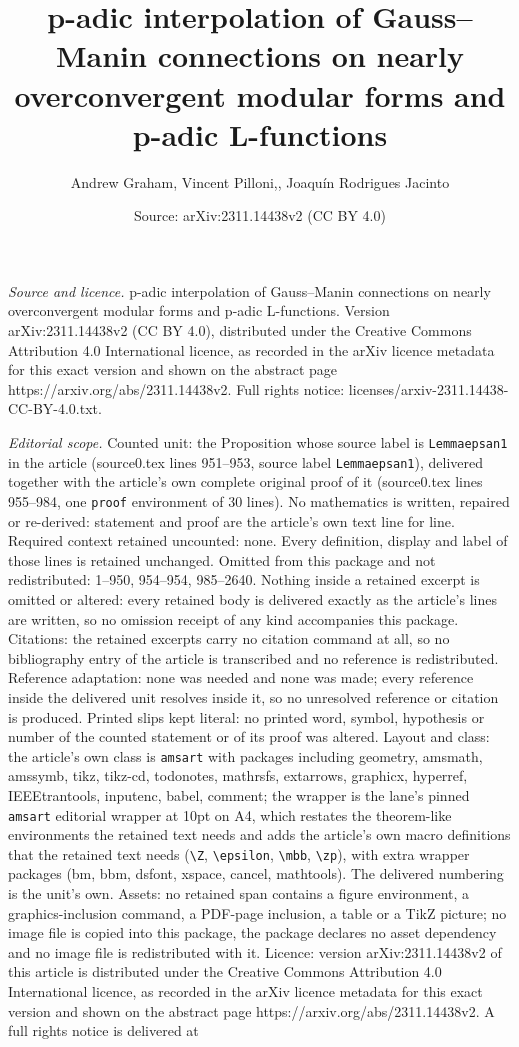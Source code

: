 \documentclass[10pt,a4paper]{amsart}
\title[p-adic interpolation of Gauss--Manin connections on nearly o]{p-adic interpolation of Gauss--Manin connections on nearly overconvergent modular forms and p-adic L-functions}
\author{Andrew Graham, Vincent Pilloni,, Joaqu\'in Rodrigues Jacinto}
\date{Source: arXiv:2311.14438v2 (CC BY 4.0)}
\begin{document}
\maketitle

\noindent\emph{Source and licence.} p-adic interpolation of Gauss--Manin connections on nearly overconvergent modular forms and p-adic L-functions. Version arXiv:2311.14438v2 (CC BY 4.0), distributed under the Creative Commons Attribution 4.0 International licence, as recorded in the arXiv licence metadata for this exact version and shown on the abstract page https://arxiv.org/abs/2311.14438v2. Full rights notice: licenses/arxiv-2311.14438-CC-BY-4.0.txt.\par\smallskip

\noindent\textit{Editorial scope.} Counted unit: the Proposition whose source label is \texttt{Lemmaepsan1} in the article (source0.tex lines 951--953, source label \texttt{Lemmaepsan1}), delivered together with the article's own complete original proof of it (source0.tex lines 955--984, one \texttt{proof} environment of 30 lines). No mathematics is written, repaired or re-derived: statement and proof are the article's own text line for line. Required context retained uncounted: none. Every definition, display and label of those lines is retained unchanged. Omitted from this package and not redistributed: 1--950, 954--954, 985--2640. Nothing inside a retained excerpt is omitted or altered: every retained body is delivered exactly as the article's lines are written, so no omission receipt of any kind accompanies this package. Citations: the retained excerpts carry no citation command at all, so no bibliography entry of the article is transcribed and no reference is redistributed. Reference adaptation: none was needed and none was made; every reference inside the delivered unit resolves inside it, so no unresolved reference or citation is produced. Printed slips kept literal: no printed word, symbol, hypothesis or number of the counted statement or of its proof was altered. Layout and class: the article's own class is \texttt{amsart} with packages including geometry, amsmath, amssymb, tikz, tikz-cd, todonotes, mathrsfs, extarrows, graphicx, hyperref, IEEEtrantools, inputenc, babel, comment; the wrapper is the lane's pinned \texttt{amsart} editorial wrapper at 10pt on A4, which restates the theorem-like environments the retained text needs and adds the article's own macro definitions that the retained text needs (\texttt{\textbackslash Z}, \texttt{\textbackslash epsilon}, \texttt{\textbackslash mbb}, \texttt{\textbackslash zp}), with extra wrapper packages (bm, bbm, dsfont, xspace, cancel, mathtools). The delivered numbering is the unit's own. Assets: no retained span contains a figure environment, a graphics-inclusion command, a PDF-page inclusion, a table or a TikZ picture; no image file is copied into this package, the package declares no asset dependency and no image file is redistributed with it. Licence: version arXiv:2311.14438v2 of this article is distributed under the Creative Commons Attribution 4.0 International licence, as recorded in the arXiv licence metadata for this exact version and shown on the abstract page https://arxiv.org/abs/2311.14438v2. A full rights notice is delivered at 
\end{document}
